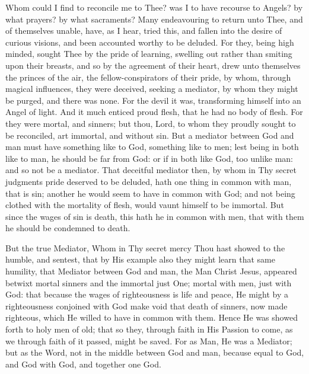 \documentclass[b5paper,openright,12pt,twoside]{book}
\begin{document}
Whom could I find to reconcile me to Thee? was I to have recourse to
Angels? by what prayers? by what sacraments? Many endeavouring to return
unto Thee, and of themselves unable, have, as I hear, tried this, and
fallen into the desire of curious visions, and been accounted worthy
to be deluded. For they, being high minded, sought Thee by the pride of
learning, swelling out rather than smiting upon their breasts, and so
by the agreement of their heart, drew unto themselves the princes of the
air, the fellow-conspirators of their pride, by whom, through magical
influences, they were deceived, seeking a mediator, by whom they might
be purged, and there was none. For the devil it was, transforming
himself into an Angel of light. And it much enticed proud flesh, that he
had no body of flesh. For they were mortal, and sinners; but thou, Lord,
to whom they proudly sought to be reconciled, art immortal, and without
sin. But a mediator between God and man must have something like to God,
something like to men; lest being in both like to man, he should be
far from God: or if in both like God, too unlike man: and so not be a
mediator. That deceitful mediator then, by whom in Thy secret judgments
pride deserved to be deluded, hath one thing in common with man, that
is sin; another he would seem to have in common with God; and not being
clothed with the mortality of flesh, would vaunt himself to be immortal.
But since the wages of sin is death, this hath he in common with men,
that with them he should be condemned to death.

But the true Mediator, Whom in Thy secret mercy Thou hast showed to the
humble, and sentest, that by His example also they might learn that
same humility, that Mediator between God and man, the Man Christ Jesus,
appeared betwixt mortal sinners and the immortal just One; mortal with
men, just with God: that because the wages of righteousness is life and
peace, He might by a righteousness conjoined with God make void that
death of sinners, now made righteous, which He willed to have in common
with them. Hence He was showed forth to holy men of old; that so they,
through faith in His Passion to come, as we through faith of it passed,
might be saved. For as Man, He was a Mediator; but as the Word, not in
the middle between God and man, because equal to God, and God with God,
and together one God.
\end{document}
